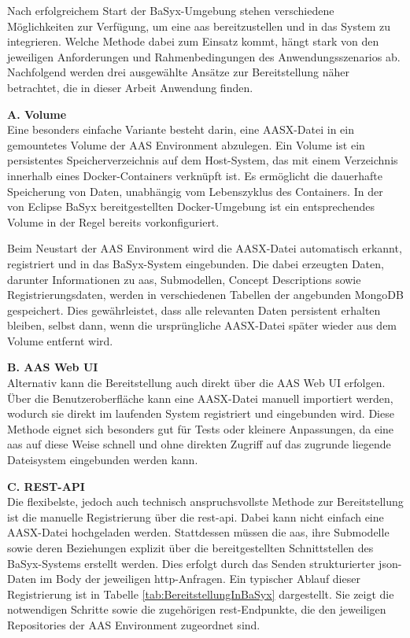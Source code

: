 Nach erfolgreichem Start der BaSyx-Umgebung stehen verschiedene Möglichkeiten zur Verfügung, um eine \acs{aas} bereitzustellen und in das System zu integrieren. 
Welche Methode dabei zum Einsatz kommt, hängt stark von den jeweiligen Anforderungen und Rahmenbedingungen des Anwendungsszenarios ab.
Nachfolgend werden drei ausgewählte Ansätze zur Bereitstellung näher betrachtet, die in dieser Arbeit Anwendung finden.

\vspace{0.5em}
\noindent\textbf{A. Volume}\\
Eine besonders einfache Variante besteht darin, eine AASX-Datei in ein gemountetes Volume der AAS Environment abzulegen.
Ein Volume ist ein persistentes Speicherverzeichnis auf dem Host-System, das mit einem Verzeichnis innerhalb eines Docker-Containers verknüpft ist.
Es ermöglicht die dauerhafte Speicherung von Daten, unabhängig vom Lebenszyklus des Containers.
In der von Eclipse BaSyx bereitgestellten Docker-Umgebung ist ein entsprechendes Volume in der Regel bereits vorkonfiguriert.

Beim Neustart der AAS Environment wird die AASX-Datei automatisch erkannt, registriert und in das BaSyx-System eingebunden.
Die dabei erzeugten Daten, darunter Informationen zu \acs{aas}, Submodellen, Concept Descriptions sowie Registrierungsdaten, werden in verschiedenen Tabellen der angebunden MongoDB gespeichert.
Dies gewährleistet, dass alle relevanten Daten persistent erhalten bleiben, selbst dann, wenn die ursprüngliche AASX-Datei später wieder aus dem Volume entfernt wird.

\vspace{0.5em}
\noindent\textbf{B. AAS Web UI}\\
Alternativ kann die Bereitstellung auch direkt über die AAS Web UI erfolgen.
Über die Benutzeroberfläche kann eine AASX-Datei manuell importiert werden, wodurch sie direkt im laufenden System registriert und eingebunden wird.
Diese Methode eignet sich besonders gut für Tests oder kleinere Anpassungen, da eine \acs{aas} auf diese Weise schnell und ohne direkten Zugriff auf das zugrunde liegende Dateisystem eingebunden werden kann.

\vspace{0.5em}
\noindent\textbf{C. REST-API}\\
Die flexibelste, jedoch auch technisch anspruchsvollste Methode zur Bereitstellung ist die manuelle Registrierung über die \acs{rest}-\acs{api}. 
Dabei kann nicht einfach eine AASX-Datei hochgeladen werden. 
Stattdessen müssen die \acs{aas}, ihre Submodelle sowie deren Beziehungen explizit über die bereitgestellten Schnittstellen des BaSyx-Systems erstellt werden. 
Dies erfolgt durch das Senden strukturierter \acs{json}-Daten im Body der jeweiligen \acs{http}-Anfragen.
Ein typischer Ablauf dieser Registrierung ist in Tabelle \ref{tab:BereitstellungInBaSyx} dargestellt. 
Sie zeigt die notwendigen Schritte sowie die zugehörigen \acs{rest}-Endpunkte, die den jeweiligen Repositories der AAS Environment zugeordnet sind.

